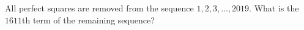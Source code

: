 All perfect squares are removed from the sequence $1,2,3,\dots,2019$. What is the $1611$th term of the remaining sequence?
